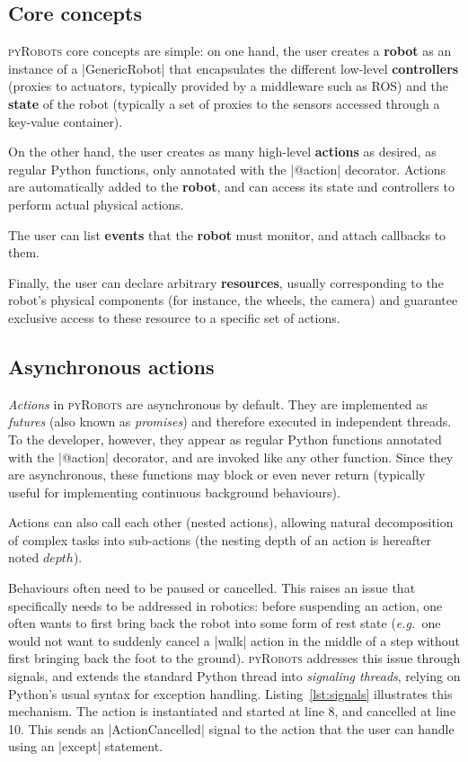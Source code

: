 \documentclass[a4paper, 10pt, conference]{ieeeconf}      %
\newcommand{\eg}{{\textit{e.g.\ }}}
\newcommand{\pyRobots}{\textsc{pyRobots}}
\begin{document}
\subsection{Core concepts}

\pyRobots{} core concepts are simple: on one hand, the user creates a
\textbf{robot} as an instance of a \python|GenericRobot| that encapsulates the
different low-level \textbf{controllers} (proxies to actuators, typically
provided by a middleware such as ROS) and the \textbf{state} of the robot
(typically a set of proxies to the sensors accessed through a key-value
container).

On the other hand, the user creates as many high-level \textbf{actions} as
desired, as regular Python functions, only annotated with the \python|@action|
decorator. Actions are automatically added to the \textbf{robot}, and can access
its state and controllers to perform actual physical actions.

The user can list \textbf{events} that the \textbf{robot} must monitor, and
attach callbacks to them.

Finally, the user can declare arbitrary \textbf{resources}, usually
corresponding to the robot's physical components (for instance, the wheels, the
camera) and guarantee exclusive access to these resource to a specific set of
actions.

\subsection{Asynchronous actions}

\emph{Actions} in \pyRobots{} are asynchronous by default. They are implemented as
\emph{futures} (also known as \emph{promises}) and therefore executed in
independent threads. To the developer, however, they appear as regular Python
functions annotated with the \python|@action| decorator, and are invoked
like any other function.  Since they are asynchronous, these functions may
block or even never return (typically useful for implementing continuous
background behaviours).

Actions can also call each other (nested actions), allowing natural
decomposition of complex tasks into sub-actions (the nesting depth of an action
is hereafter noted $depth$).

Behaviours often need to be paused or cancelled.  This raises
an issue that specifically needs to be addressed in robotics: before suspending
an action, one often wants to first bring back the robot into some form of rest
state (\eg one would not want to suddenly cancel a \python|walk| action in the
middle of a step without first bringing back the foot to the ground). \pyRobots{}
addresses this issue through signals, and extends the standard Python thread into
\emph{signaling threads}, relying on Python's usual syntax for exception
handling. Listing~\ref{lst:signals} illustrates this mechanism. The action is
instantiated and started at line 8, and cancelled at line 10. This sends an
\python|ActionCancelled| signal to the action that the user can handle using an
\python|except| statement.
\end{document}

